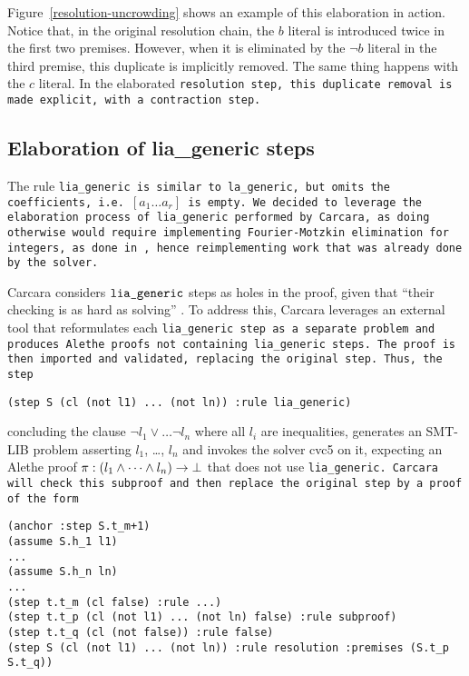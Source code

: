 Figure~\ref{resolution-uncrowding} shows an example of this elaboration in action.
Notice that, in the original resolution chain, the $b$ literal is introduced twice in the first two premises.
However, when it is eliminated by the $\neg b$ literal in the third premise, this duplicate is implicitly removed.
The same thing happens with the $c$ literal. In the elaborated \tt{resolution} step, this duplicate removal is made explicit, with a \tt{contraction} step.



\subsection{Elaboration of lia\_generic steps}
\label{ssec:elaboration-lia}

The rule \tt{lia\_generic} is similar to \tt{la\_generic}, but omits the coefficients,
i.e.\ \colorbox{orange!30}{$[a_1 \dots a_r]$} is empty.
We decided to leverage the elaboration process of \tt{lia\_generic} performed by Carcara, as doing otherwise would require implementing Fourier-Motzkin elimination for integers, as done in \cite{micromega,omegatest}, hence reimplementing work that was already done by the solver.

Carcara considers $\tt{lia\_generic}$ steps as holes in the proof, given that ``their checking is as hard as solving'' \cite[\S 3.2]{carcara}.
To address this, Carcara leverages an external tool that reformulates each \tt{lia\_generic} step as a separate problem and produces Alethe proofs not containing \tt{lia\_generic} steps.
The proof is then imported and validated, replacing the original step.
Thus, the step
%
\begin{lstlisting}[language=SMT, frame=none, numbers=none]
    (step S (cl (not l1) ... (not ln)) :rule lia_generic)
\end{lstlisting}
%
concluding the clause $\neg l_1 \lor \dots \neg l_n$ where all $l_i$ are inequalities, generates an SMT-LIB problem asserting $l_1$, \dots, $l_n$ and invokes the solver cvc5 on it, expecting an Alethe proof $\pi : (l_1 \land \dots \land l_n) \ra \bot$
that does not use \tt{lia\_generic}. Carcara will check this subproof and then replace the original step by a proof of the form

\begin{lstlisting}[language=SMT,caption={Elaboration of \tt{lia\_generic}},label={lst:elab_lia}]
(anchor :step S.t_m+1)
(assume S.h_1 l1)
...
(assume S.h_n ln)
...
(step t.t_m (cl false) :rule ...)
(step t.t_p (cl (not l1) ... (not ln) false) :rule subproof)
(step t.t_q (cl (not false)) :rule false)
(step S (cl (not l1) ... (not ln)) :rule resolution :premises (S.t_p S.t_q))
\end{lstlisting}

